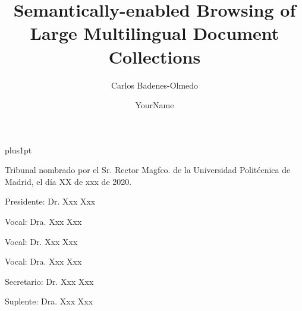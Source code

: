 \documentclass[twoside,11pt]{Latex/Classes/PhDthesisPSnPDF}
\title{Semantically-enabled Browsing of Large Multilingual Document Collections}
\author{{\hspace{16mm} Carlos Badenes-Olmedo }}
\author{YourName}
\begin{document}

\renewcommand\baselinestretch{1.2}
\baselineskip=18pt plus1pt

\theoremstyle{plain}
\newtheorem{thm}{Theorem}[chapter] %

\theoremstyle{definition}
\newtheorem{defn}[thm]{Definition} %

\newcommand{\attention}[1]{{\color{red}\textbf{#1}}}
\newcommand{\comm}[1]{{\color{red}(Comment:#1)}}
\newcommand{\duda}[1]{{\color{red}(DUDA:#1)}}

\renewcommand\appendixname{ANNEX}


\frontmatter
\maketitle  %



\pagestyle{plain}
\cleardoublepage
\pagestyle{plain}

\noindent Tribunal nombrado por el Sr. Rector Magfco. de la Universidad Polit\'{e}cnica de
Madrid, el d\'{i}a XX de xxx de 2020.

\vspace{10mm}
Presidente:\hspace{0.3mm} Dr. Xxx Xxx

\vspace{5mm}
Vocal: \hspace{6.7mm} Dra. Xxx Xxx 

\vspace{5mm}
Vocal: \hspace{6.7mm} Dr. Xxx Xxx

\vspace{5mm}
Vocal: \hspace{6.7mm} Dra. Xxx Xxx

\vspace{5mm}
Secretario:\hspace{0.65mm} Dr. Xxx Xxx

\vspace{5mm}
Suplente: \hspace{1.5mm} Dra. Xxx Xxx
\end{document}
